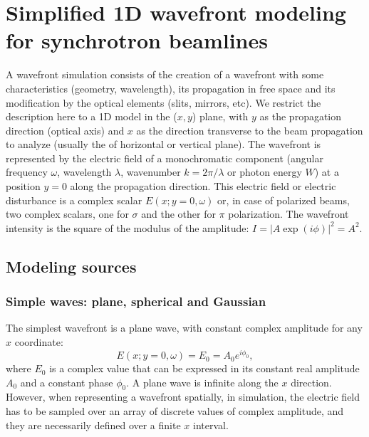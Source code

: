 \documentclass[preprint]{iucr}
\begin{document}
%
%
%
\section{Simplified 1D wavefront modeling for synchrotron beamlines}
\label{sec:wofry}

A wavefront simulation consists of the creation of a wavefront with some characteristics (geometry, wavelength), its propagation in free space and its modification by the optical elements (slits, mirrors, etc). We restrict the description here to a 1D model in the ($x,y$) plane, with $y$ as the propagation direction (optical axis) and $x$ as the direction transverse to the beam propagation to analyze (usually the of horizontal or vertical plane). The wavefront is represented by the electric field of a monochromatic component (angular frequency $\omega$, wavelength $\lambda$, wavenumber $k = 2 \pi / \lambda$ or photon energy $W$) at a position $y=0$ along the propagation direction. This electric field or electric disturbance is a complex scalar $E(x;y=0,\omega)$ or, in case of polarized beams, two complex scalars, one for $\sigma$ and the other for $\pi$ polarization. The wavefront intensity is the square of the modulus of the amplitude: $I=|A \exp{(i\phi)}|^2=A^2$. 

\subsection{Modeling sources}
\label{sec:sources}

\subsubsection{Simple waves: plane, spherical and Gaussian}

The simplest wavefront is a plane wave, with constant complex amplitude for any $x$ coordinate: 
\begin{equation}
   E(x;y=0,\omega)=E_0=A_0 e^{i \phi_0},
\end{equation}
where $E_0$ is a complex value that can be expressed in its constant real amplitude $A_0$ and a constant phase $\phi_0$. A plane wave is infinite along the $x$ direction. However, when representing a wavefront spatially, in simulation, the electric field has to be sampled over an array of discrete values of complex amplitude, and they are necessarily defined over a finite $x$ interval. 
\end{document}
